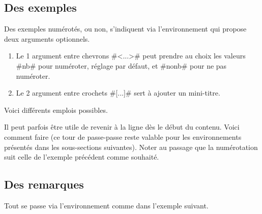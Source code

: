 

\subsection{Des exemples}

Des exemples numérotés, ou non, s'indiquent via l'environnement  qui propose deux arguments optionnels.

\begin{enumerate}
    \item Le 1\ier{} argument entre chevrons \tdocinlatex#<...># peut prendre au choix les valeurs \tdocinlatex#nb# pour numéroter, réglage par défaut, et \tdocinlatex#nonb# pour ne pas numéroter.

    \item Le 2\ieme{} argument entre crochets \tdocinlatex#[...]# sert à ajouter un mini-titre.
\end{enumerate}


Voici différents emplois possibles.









\begin{tdoctip}
    Il peut parfois être utile de revenir à la ligne dès le début du contenu. Voici comment faire (ce tour de passe-passe reste valable pour les environnements présentés dans les sous-sections suivantes). Noter au passage que la numérotation suit celle de l'exemple précédent comme souhaité.

\end{tdoctip}


\subsection{Des remarques}

Tout se passe via l'environnement  comme dans l'exemple suivant.

